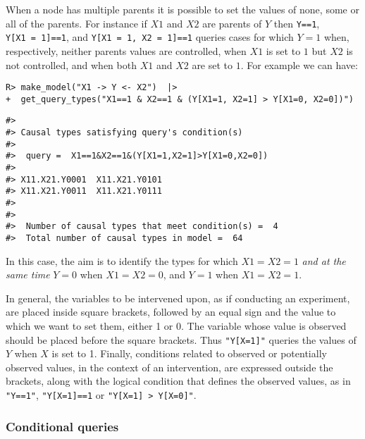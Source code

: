 \documentclass[
  11pt,
  article]{jss}
\begin{document}
When a node has multiple parents it is possible to set the values of
none, some or all of the parents. For instance if \(X1\) and \(X2\) are
parents of \(Y\) then \texttt{Y==1}, \texttt{Y{[}X1\ =\ 1{]}==1}, and
\texttt{Y{[}X1\ =\ 1,\ X2\ =\ 1{]}==1} queries cases for which \(Y=1\)
when, respectively, neither parents values are controlled, when \(X1\)
is set to \(1\) but \(X2\) is not controlled, and when both \(X1\) and
\(X2\) are set to \(1\). For example we can have:

\begin{verbatim}
R> make_model("X1 -> Y <- X2")  |>
+  get_query_types("X1==1 & X2==1 & (Y[X1=1, X2=1] > Y[X1=0, X2=0])")
\end{verbatim}

\begin{verbatim}
#> 
#> Causal types satisfying query's condition(s)  
#> 
#>  query =  X1==1&X2==1&(Y[X1=1,X2=1]>Y[X1=0,X2=0]) 
#> 
#> X11.X21.Y0001  X11.X21.Y0101
#> X11.X21.Y0011  X11.X21.Y0111
#> 
#> 
#>  Number of causal types that meet condition(s) =  4
#>  Total number of causal types in model =  64
\end{verbatim}

In this case, the aim is to identify the types for which \(X1=X2=1\)
\emph{and at the same time} \(Y=0\) when \(X1 = X2 = 0\), and \(Y = 1\)
when \(X1 = X2 = 1\).

In general, the variables to be intervened upon, as if conducting an
experiment, are placed inside square brackets, followed by an equal sign
and the value to which we want to set them, either 1 or 0. The variable
whose value is observed should be placed before the square brackets.
Thus \texttt{"Y{[}X=1{]}"} queries the values of \(Y\) when \(X\) is set
to 1. Finally, conditions related to observed or potentially observed
values, in the context of an intervention, are expressed outside the
brackets, along with the logical condition that defines the observed
values, as in \texttt{"Y==1"}, \texttt{"Y{[}X=1{]}==1} or
\texttt{"Y{[}X=1{]}\ \textgreater{}\ Y{[}X=0{]}"}.

\hypertarget{conditional-queries}{%
\subsubsection{Conditional queries}\label{conditional-queries}}
\end{document}

